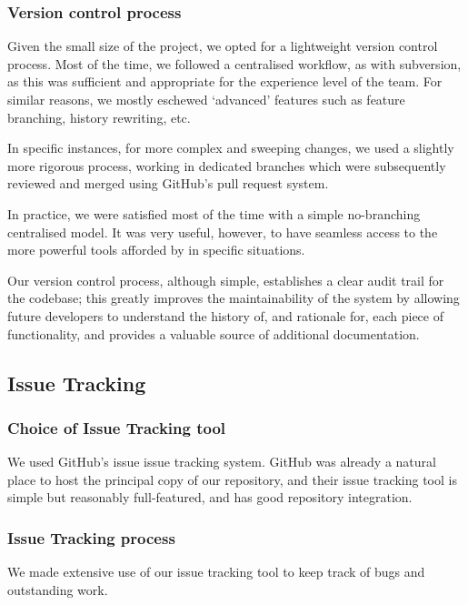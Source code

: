 \subsubsection{Version control process}

Given the small size of the project, we opted for a lightweight
version control process. Most of the time, we followed a centralised
workflow, as with subversion, as this was sufficient and appropriate
for the experience level of the team. For similar reasons, we mostly
eschewed `advanced' features such as feature branching, history
rewriting, etc.

In specific instances, for more complex and sweeping changes, we used
a slightly more rigorous process, working in dedicated branches which
were subsequently reviewed and merged using GitHub's pull request
system.

In practice, we were satisfied most of the time with a simple
no-branching centralised model. It was very useful, however, to have
seamless access to the more powerful tools afforded by  in
specific situations.

Our version control process, although simple, establishes a clear
audit trail for the codebase; this greatly improves the
maintainability of the system by allowing future developers to
understand the history of, and rationale for, each piece of
functionality, and provides a valuable source of additional
documentation.

\subsection{Issue Tracking}

\subsubsection{Choice of Issue Tracking tool}

We used GitHub's issue issue tracking system. GitHub was already a
natural place to host the principal copy of our repository, and their
issue tracking tool is simple but reasonably full-featured, and
has good repository integration.

\subsubsection{Issue Tracking process}

We made extensive use of our issue tracking tool to keep track of bugs
and outstanding work.

